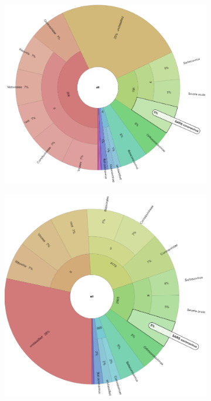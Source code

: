     \begin{figure}[ht!]
        \centering
        \begin{subfigure}[b]{0.3\textwidth}
        \includegraphics[width=1\textwidth]{figures/results/real/krona/krona-sf-sSRR12596166.png}
        \label{fig:results:real:krona-sf-a}
        \end{subfigure}
        \hfill
        \begin{subfigure}[b]{0.3\textwidth}
        \includegraphics[width=1\textwidth]{figures/results/real/krona/krona-sf-sSRR12596175.png}

\end{subfigure}
\end{figure}
